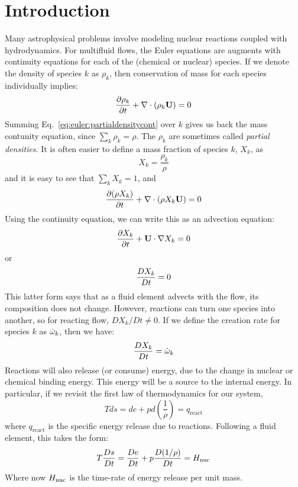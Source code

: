 
\section{Introduction}

Many astrophysical problems involve modeling nuclear reactions coupled
with hydrodynamics.  For multifluid flows, the Euler equations are
augments with continuity equations for each of the (chemical or
nuclear) species.  If we denote the density of species $k$ as
$\rho_k$, then conservation of mass for each species individually
implies:
\begin{equation}
\label{eq:euler:partialdensitycont}
{\frac{{\partial\rho_k}}{\partial t}} + \nabla \cdot (\rho_k {\bf U}) = 0
\end{equation}
Summing Eq.~\ref{eq:euler:partialdensitycont} over $k$ gives us back
the mass contunity equation, since $\sum_k \rho_k = \rho$.  The
$\rho_k$ are sometimes called {\em partial densities}.  It is often
easier to define a mass fraction of species $k$, $X_k$, as
\begin{equation}
X_k = \frac{\rho_k}{\rho}
\end{equation}
and it is easy to see that $\sum_k X_k = 1$, and 
\begin{equation}
\frac{\partial (\rho X_k)}{\partial t} + \nabla \cdot  (\rho X_k {\bf U}) = 0
\end{equation}
Using the continuity equation, we can write this as an advection
equation:
\begin{equation}
\frac{\partial X_k}{\partial t} + {\bf U} \cdot \nabla X_k = 0
\end{equation}
or 
\begin{equation}
{\frac{{DX_k}}{D t}} = 0
\end{equation}
This latter form says that as a fluid element advects with the flow,
its composition does not change.  However, reactions can turn one
species into another, so for reacting flow, $DX_k/Dt \ne 0$.  If we
define the creation rate for species $k$ as ${\dot{\omega}}_k$, then we have:
\begin{equation}
{\frac{{DX_k}}{D t}} = {\dot{\omega}}_k
\end{equation}
Reactions will also release (or consume) energy, due to the change in
nuclear or chemical binding energy.  This energy will be a source to
the internal energy.  In particular, if we revisit the first law of
thermodynamics for our system,
\begin{equation}
T ds = de + p d \left( \frac{1}{\rho}\right ) = q_\mathrm{react}
\end{equation}
where $q_\mathrm{react}$ is the specific energy release due to
reactions.  Following a fluid element, this takes the form:
\begin{equation}
T{\frac{{Ds}}{D t}} = {\frac{{De}}{D t}} + p {\frac{{D(1/\rho)}}{D t}} = {H_\mathrm{nuc}}
\end{equation}
Where now ${H_\mathrm{nuc}}$ is the time-rate of energy release per unit mass.

